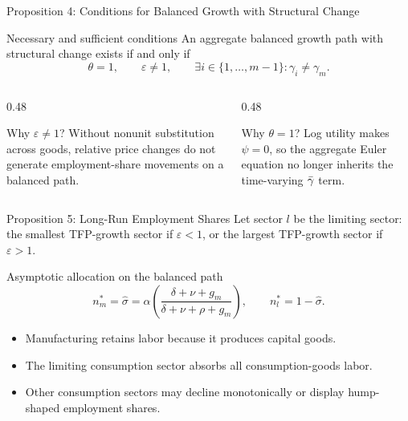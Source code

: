 \begin{frame}[label=balancedgrowth]{Proposition 4: Conditions for Balanced Growth with Structural Change}
  \small
  \begin{alertblock}{Necessary and sufficient conditions}
    An aggregate balanced growth path with structural change exists if and only if
    \begin{equation*}
      \theta=1,\qquad \varepsilon\neq 1,\qquad
      \exists i\in\{1,\ldots,m-1\}: \gamma_i\neq\gamma_m .
    \end{equation*}
  \end{alertblock}

  \vspace{0.12cm}
  \begin{columns}[T,onlytextwidth]
    \begin{column}{0.48\textwidth}
      \begin{block}{Why $\varepsilon\neq1$?}
        Without nonunit substitution across goods, relative price changes do
        not generate employment-share movements on a balanced path.
      \end{block}
    \end{column}
    \begin{column}{0.48\textwidth}
      \begin{block}{Why $\theta=1$?}
        Log utility makes $\psi=0$, so the aggregate Euler equation no longer
        inherits the time-varying $\bar{\gamma}$ term.
      \end{block}
    \end{column}
  \end{columns}
  \hyperlink{appendixbalanced}{}
\end{frame}

\begin{frame}{Proposition 5: Long-Run Employment Shares}
  \small
  Let sector $l$ be the limiting sector:
  the smallest TFP-growth sector if $\varepsilon<1$, or the largest TFP-growth
  sector if $\varepsilon>1$.

  \vspace{0.12cm}
  \begin{alertblock}{Asymptotic allocation on the balanced path}
    \begin{equation*}
      n_m^*=\hat{\sigma}
      =
      \alpha\left(
        \frac{\delta+\nu+g_m}{\delta+\nu+\rho+g_m}
      \right),
      \qquad
      n_l^*=1-\hat{\sigma}.
    \end{equation*}
  \end{alertblock}

  \begin{itemize}
    \item Manufacturing retains labor because it produces capital goods.
    \item The limiting consumption sector absorbs all consumption-goods labor.
    \item Other consumption sectors may decline monotonically or display
      hump-shaped employment shares.
  \end{itemize}
\end{frame}
